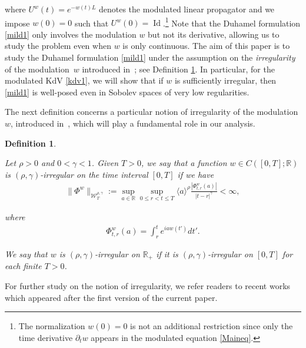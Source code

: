 \documentclass[letterpaper, 11pt,  reqno]{amsart}
\newtheorem{definition}[theorem]{Definition}
\DeclareMathOperator{\Id}{Id}
\newcommand{\1}{\hspace{0.5mm}\text{I}\hspace{0.5mm}}
\newcommand{\noi}{\noindent}
\newcommand{\R}{\mathbb{R}}
\newcommand{\g}{\gamma}
\newcommand{\dt}{\partial_t}
\newcommand{\W}{\mathcal{W}}
\numberwithin{equation}{section}
\numberwithin{theorem}{section}
\begin{document}
\noi
where $U^w(t) = e^{- w(t) L }$ denotes the modulated linear propagator
and we impose $w(0) = 0$ such that  
 $U^w(0) = \Id$.\footnote{The normalization $w(0) = 0$
 is not an additional restriction since only the time derivative $\dt w$
 appears in the modulated equation \eqref{Maineq}.}
Note that the Duhamel formulation \eqref{mild1}
only involves the modulation $w$ but not its derivative, 
allowing us to study the problem
even when $w$ is only continuous.
The aim of this paper is to study 
the Duhamel formulation \eqref{mild1} under 
the assumption on the  \emph{irregularity} of the modulation~$w$ 
introduced in~\cite{CatellierGubinelli, CG1};
see Definition \ref{DEF:ir}.
In particular,
for the modulated KdV \eqref{kdv1}, 
we will show that if $w$ is sufficiently irregular,
then \eqref{mild1} is well-posed even in Sobolev spaces
of very low regularities.


The next definition concerns a particular notion of irregularity of the modulation $w$, 
introduced in~\cite{CatellierGubinelli, CG1}, 
which  will play a fundamental role  in our analysis.

\begin{definition}
\label{DEF:ir}
\rm

Let $\rho>0$ and  $0 < \g < 1$.
Given $T > 0$, we say that a function $w\in C([0,T];\R)$ is $(\rho,\g)$-irregular 
on the time interval $[0, T]$  if we have
\begin{align}
\|\Phi^w\|_{  \W^{\rho,\g}_T} 
:= \sup_{a\in \R} \sup_{0\leq r < t\leq T} \langle a \rangle^\rho \frac{|\Phi^w_{t,r}(a)|}{|t-r|^\g} 
< \infty, 
\label{rho1}
\end{align}


\noi
where 
\begin{align}
\Phi^w_{t,r}(a)
=\int_r^t e^{i  a w(t') } d t'.
\label{rho2}
\end{align}


\noi
We say that $w$ is 
$(\rho,\g)$-irregular 
on $\R_+$  if it is 
$(\rho,\g)$-irregular 
on $[0, T]$ for each finite $T > 0$.


\end{definition}


For further study on the notion of irregularity, 
we refer readers to 
 recent works \cite{GG, RT}
which appeared after the first version of the current paper.
\end{document}
